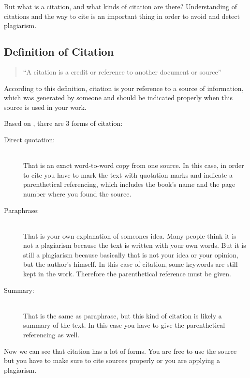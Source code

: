 But what is a citation, and 
what kinds of citation are there? Understanding of citations and the way to cite is an important thing in order to 
avoid and detect plagiarism.

\subsection{Definition of Citation}

\begin{quote}\enquote{A citation is a credit or reference to another document or source}\\ \citep{wiki:Citation}\end{quote}

According to this definition, citation is your reference to a source of information, which was generated by someone 
and should be indicated properly when this source is used in your work.

Based on \citet{Wiredprof2010}, there are 3 forms of citation:

\begin{description}
\item[Direct quotation:] \hfill \\
That is an exact word-to-word copy from one source. In this case, in order to cite you have to mark 
the text with quotation marks and indicate a  parenthetical referencing, which includes the book’s name and the page 
number where you found the source.
\item[Paraphrase:] \hfill \\
That is your own explanation of someones idea. Many people think it is not a plagiarism because the text 
is written with your own words. But it is still a plagiarism because basically that is not your idea or your opinion, 
but the author’s himself. In this case of citation, some keywords are still kept in the work. Therefore the 
parenthetical reference must be given.
\item[Summary:] \hfill \\
That is the same as paraphrase, but this kind of citation is likely a summary of the text. In this case you 
have to give the parenthetical referencing as well.
\end{description}

Now we can see that citation has a lot of forms. You are free to use the source but you have to make sure to cite 
sources properly 
or you are applying a plagiarism.

